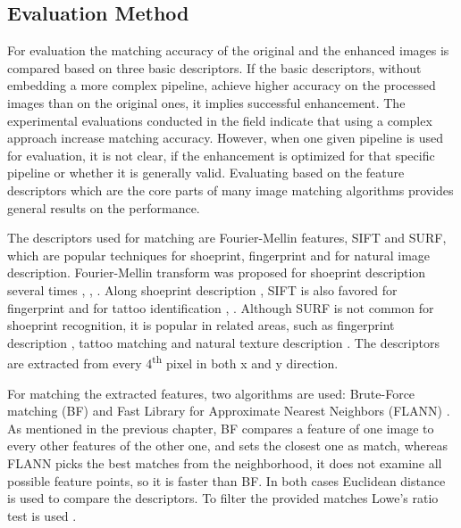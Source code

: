 \documentclass[draft,final]{vutinfth} %
\begin{document}
\subsection{Evaluation Method}
\par
For evaluation the matching accuracy of the original and the enhanced images is compared based on three basic descriptors.
If the basic descriptors, without embedding  a more complex pipeline, achieve higher accuracy on the processed  images than on the original ones, it implies successful enhancement. 
The experimental evaluations conducted in the field indicate \cite{rida2019forensic} that using a complex approach increase matching accuracy.
However, when one given pipeline is used for evaluation, it is not clear, if the enhancement is optimized for that specific pipeline or whether it is generally valid.
Evaluating based on the feature descriptors which are the core parts of many image matching algorithms provides general results on the performance.
\par
The descriptors used for matching are Fourier-Mellin features, SIFT and SURF, which are popular techniques for shoeprint, fingerprint and for natural image description.
Fourier-Mellin transform was proposed for shoeprint description several times \cite{gueham2008automatic}, \cite{richetelli2017classification}, \cite{wu2019crime}.
Along shoeprint description \cite{nibouche2009rotation}, \cite{richetelli2017classification} SIFT is also favored for fingerprint \cite{zhou2011adaptive} and for tattoo identification \cite{yi2015impact}, \cite{han2013tattoo}.
Although SURF is not common for shoeprint recognition, it is popular in related areas, such as fingerprint description \cite{jahan2017robust}, tattoo matching \cite{yi2015impact} and natural texture description \cite{prabhakar2012lbp}.
The descriptors are extracted from every 4\textsuperscript{th} pixel in both x and y direction.
\par
For matching the extracted features, two algorithms are used: Brute-Force matching (BF) \cite{schaeffer1993re} and Fast Library for Approximate Nearest Neighbors (FLANN) \cite{muja2009fast}.
As mentioned in the previous chapter, BF compares a feature of one image to every other features of the other one, and sets the closest one as match, whereas FLANN picks the best matches from the neighborhood, it does not examine all possible feature points, so it is faster than BF.
In both cases Euclidean distance is used to compare the descriptors.
To filter the provided matches Lowe's ratio test is used \cite{lowe2004distinctive}.
\end{document}

